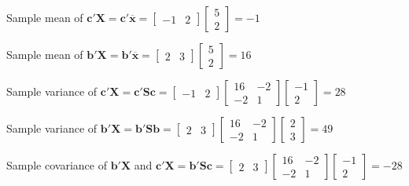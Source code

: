 \documentclass[12pt]{article}
\newcommand{\vct}{\mathbf}
\begin{document}
\begin{enumerate}[label=\alph*)]
         Sample mean of $\vct{c'X} = \vct{c'\overline{x}} = \begin{bmatrix}
           -1 & 2
         \end{bmatrix} \begin{bmatrix}
           5 \\
           2
         \end{bmatrix} = -1$
         
         Sample mean of $\vct{b'X} = \vct{b'\overline{x}} = \begin{bmatrix}
           2 & 3
         \end{bmatrix} \begin{bmatrix}
           5 \\
           2
         \end{bmatrix} = 16$
         
         Sample variance of $\vct{c'X} = \vct{c'Sc} = \begin{bmatrix}
           -1 & 2
         \end{bmatrix} \begin{bmatrix}
           16 & -2\\
           -2 & 1
         \end{bmatrix} \begin{bmatrix}
           -1 \\
            2
         \end{bmatrix} = 28$
         
         Sample variance of $\vct{b'X} = \vct{b'Sb} = \begin{bmatrix}
           2 & 3
         \end{bmatrix} \begin{bmatrix}
           16 & -2\\
           -2 & 1
         \end{bmatrix} \begin{bmatrix}
           2 \\
           3
         \end{bmatrix} = 49$
         
         Sample covariance of $\vct{b'X}$ and $\vct{c'X} = \vct{b'Sc} = \begin{bmatrix}
           2 & 3
         \end{bmatrix} \begin{bmatrix}
           16 & -2\\
           -2 & 1
         \end{bmatrix} \begin{bmatrix}
           -1 \\
           2
         \end{bmatrix} = -28$  
\end{enumerate}
\end{document}
